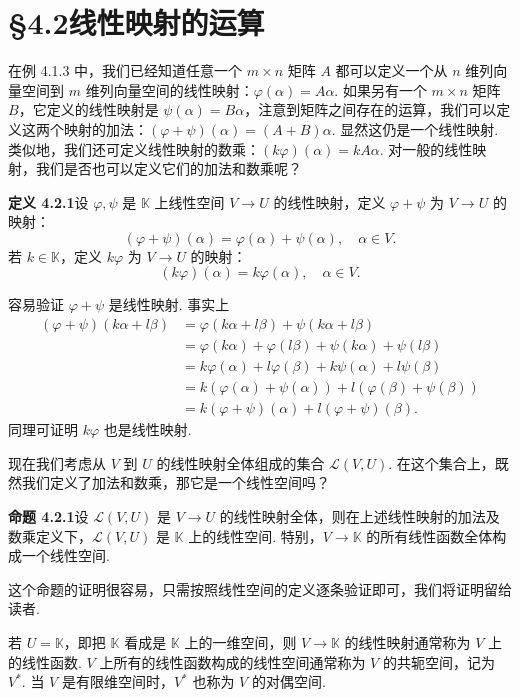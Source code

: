 \documentclass[UTF8, 12pt, fontset=fandol, oneside]{ctexart}
\begin{document}
\section*{§4.2\quad 线性映射的运算}

在例 4.1.3 中，我们已经知道任意一个 $m\times n$ 矩阵 $A$ 都可以定义一个从 $n$ 维列向量空间到 $m$ 维列向量空间的线性映射：$\varphi(\alpha)=A\alpha$. 如果另有一个 $m\times n$ 矩阵 $B$，它定义的线性映射是 $\psi(\alpha)=B\alpha$，注意到矩阵之间存在的运算，我们可以定义这两个映射的加法：$(\varphi+\psi)(\alpha)=(A+B)\alpha$. 显然这仍是一个线性映射. 类似地，我们还可定义线性映射的数乘：$(k\varphi)(\alpha)=kA\alpha$. 对一般的线性映射，我们是否也可以定义它们的加法和数乘呢？

\noindent\textbf{定义 4.2.1}\quad 设 $\varphi,\psi$ 是 $\mathbb{K}$ 上线性空间 $V\to U$ 的线性映射，定义 $\varphi+\psi$ 为 $V\to U$ 的映射：
\[
(\varphi+\psi)(\alpha)=\varphi(\alpha)+\psi(\alpha),\quad \alpha\in V.
\]
若 $k\in\mathbb{K}$，定义 $k\varphi$ 为 $V\to U$ 的映射：
\[
(k\varphi)(\alpha)=k\varphi(\alpha),\quad \alpha\in V.
\]

容易验证 $\varphi+\psi$ 是线性映射. 事实上
\[
\begin{aligned}
(\varphi+\psi)(k\alpha+l\beta)
&=\varphi(k\alpha+l\beta)+\psi(k\alpha+l\beta)\\
&=\varphi(k\alpha)+\varphi(l\beta)+\psi(k\alpha)+\psi(l\beta)\\
&=k\varphi(\alpha)+l\varphi(\beta)+k\psi(\alpha)+l\psi(\beta)\\
&=k(\varphi(\alpha)+\psi(\alpha))+l(\varphi(\beta)+\psi(\beta))\\
&=k(\varphi+\psi)(\alpha)+l(\varphi+\psi)(\beta).
\end{aligned}
\]
同理可证明 $k\varphi$ 也是线性映射.

现在我们考虑从 $V$ 到 $U$ 的线性映射全体组成的集合 $\mathcal{L}(V,U)$. 在这个集合上，既然我们定义了加法和数乘，那它是一个线性空间吗？

\noindent\textbf{命题 4.2.1}\quad 设 $\mathcal{L}(V,U)$ 是 $V\to U$ 的线性映射全体，则在上述线性映射的加法及数乘定义下，$\mathcal{L}(V,U)$ 是 $\mathbb{K}$ 上的线性空间. 特别，$V\to\mathbb{K}$ 的所有线性函数全体构成一个线性空间.

这个命题的证明很容易，只需按照线性空间的定义逐条验证即可，我们将证明留给读者.

若 $U=\mathbb{K}$，即把 $\mathbb{K}$ 看成是 $\mathbb{K}$ 上的一维空间，则 $V\to\mathbb{K}$ 的线性映射通常称为 $V$ 上的线性函数. $V$ 上所有的线性函数构成的线性空间通常称为 $V$ 的共轭空间，记为 $V^*$. 当 $V$ 是有限维空间时，$V^*$ 也称为 $V$ 的对偶空间.
\end{document}

